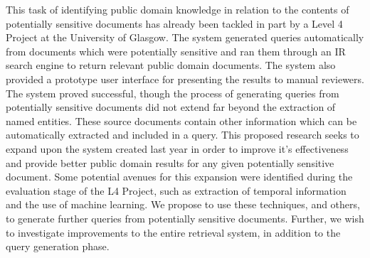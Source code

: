 \documentclass{mprop}
\begin{document}
This task of identifying public domain knowledge in relation to the contents of potentially sensitive documents has already been tackled in part by a Level 4 Project at the University of Glasgow. 
The system generated queries automatically from documents which were potentially sensitive and ran them through an IR search engine to return relevant public domain documents.
The system also provided a prototype user interface for presenting the results to manual reviewers.
The system proved successful, though the process of generating queries from potentially sensitive documents did not extend far beyond the extraction of named entities. 
These source documents contain other information which can be automatically extracted and included in a query.
This proposed research seeks to expand upon the system created last year in order to improve it's effectiveness and provide better public domain results for any given potentially sensitive document.
Some potential avenues for this expansion were identified during the evaluation stage of the L4 Project, such as extraction of temporal information and the use of machine learning.
We propose to use these techniques, and others, to generate further queries from potentially sensitive documents.
Further, we wish to investigate improvements to the entire retrieval system, in addition to the query generation phase.



\end{document}
